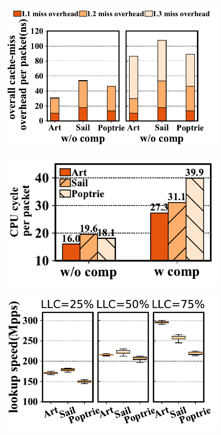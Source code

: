 \documentclass[a4paper]{article}
\begin{document}
    \begin{figure}[htbp]
        \includegraphics{../result/example-pdf/example3.pdf}
    \end{figure}

    \begin{figure}[htbp]
        \includegraphics{../result/example-pdf/example4.pdf}
    \end{figure}

    \begin{figure}[htbp]
        \includegraphics{../result/example-pdf/example5.pdf}
    \end{figure}
\end{document}

